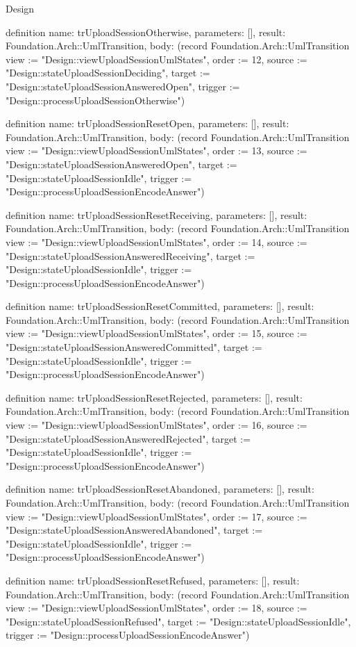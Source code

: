 \begin{lexlean}{Design}
\begin{semanticmodule}
definition{
  name: trUploadSessionOtherwise,
  parameters: [],
  result: Foundation.Arch::UmlTransition,
  body: (record Foundation.Arch::UmlTransition {view := "Design::viewUploadSessionUmlStates", order := 12, source := "Design::stateUploadSessionDeciding", target := "Design::stateUploadSessionAnsweredOpen", trigger := "Design::processUploadSessionOtherwise"})
}

definition{
  name: trUploadSessionResetOpen,
  parameters: [],
  result: Foundation.Arch::UmlTransition,
  body: (record Foundation.Arch::UmlTransition {view := "Design::viewUploadSessionUmlStates", order := 13, source := "Design::stateUploadSessionAnsweredOpen", target := "Design::stateUploadSessionIdle", trigger := "Design::processUploadSessionEncodeAnswer"})
}

definition{
  name: trUploadSessionResetReceiving,
  parameters: [],
  result: Foundation.Arch::UmlTransition,
  body: (record Foundation.Arch::UmlTransition {view := "Design::viewUploadSessionUmlStates", order := 14, source := "Design::stateUploadSessionAnsweredReceiving", target := "Design::stateUploadSessionIdle", trigger := "Design::processUploadSessionEncodeAnswer"})
}

definition{
  name: trUploadSessionResetCommitted,
  parameters: [],
  result: Foundation.Arch::UmlTransition,
  body: (record Foundation.Arch::UmlTransition {view := "Design::viewUploadSessionUmlStates", order := 15, source := "Design::stateUploadSessionAnsweredCommitted", target := "Design::stateUploadSessionIdle", trigger := "Design::processUploadSessionEncodeAnswer"})
}

definition{
  name: trUploadSessionResetRejected,
  parameters: [],
  result: Foundation.Arch::UmlTransition,
  body: (record Foundation.Arch::UmlTransition {view := "Design::viewUploadSessionUmlStates", order := 16, source := "Design::stateUploadSessionAnsweredRejected", target := "Design::stateUploadSessionIdle", trigger := "Design::processUploadSessionEncodeAnswer"})
}

definition{
  name: trUploadSessionResetAbandoned,
  parameters: [],
  result: Foundation.Arch::UmlTransition,
  body: (record Foundation.Arch::UmlTransition {view := "Design::viewUploadSessionUmlStates", order := 17, source := "Design::stateUploadSessionAnsweredAbandoned", target := "Design::stateUploadSessionIdle", trigger := "Design::processUploadSessionEncodeAnswer"})
}

definition{
  name: trUploadSessionResetRefused,
  parameters: [],
  result: Foundation.Arch::UmlTransition,
  body: (record Foundation.Arch::UmlTransition {view := "Design::viewUploadSessionUmlStates", order := 18, source := "Design::stateUploadSessionRefused", target := "Design::stateUploadSessionIdle", trigger := "Design::processUploadSessionEncodeAnswer"})
}


\end{semanticmodule}
\end{lexlean}
